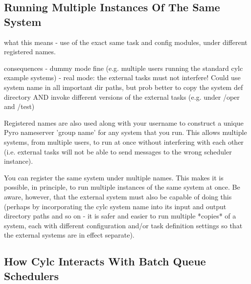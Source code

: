 \documentclass[11pt,a4paper]{article}
\begin{document}
%

\subsection{Running Multiple Instances Of The Same System}
\label{RunningMultipleInstancesOfTheSameSystem}

what this means - use of the exact same task and config modules, under 
different registered names.

consequences - dummy mode fine (e.g. multiple users running the standard
cylc example systems)
             - real mode: the external tasks must not interfere! Could
             use system name in all important dir paths, but prob better 
             to copy the system def directory AND invoke different versions
             of the external tasks (e.g. under /oper and /test)

    Registered names are also used along with your username to construct
    a unique Pyro nameserver 'group name' for any system that you run.
    This allows multiple systems, from multiple users, to run at once
    without interfering with each other (i.e. external tasks will not
    be able to send messages to the wrong scheduler instance).
    
    You can register the same system under multiple names. This makes
    it is possible, in principle, to run multiple instances of the
    same system at once. Be aware, however, that the external system
    must also be capable of doing this (perhaps by incorporating the
    cylc system name into its input and output directory paths and
    so on - it is safer and easier to run multiple *copies* of a
    system, each with different configuration and/or task definition
    settings so that the external systems are in effect separate).


\subsection{How Cylc Interacts With Batch Queue Schedulers}
\label{HowCylcInteractsWithBatchQueueSchedulers}
\end{document}
